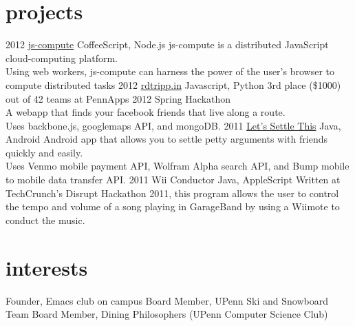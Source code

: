 \documentclass[print]{friggeri-cv}
\begin{document}
\section{projects}

\begin{entrylist}
  \entry
  {2012}
  {\href{http://andrewbraunstein.com:3000}{js-compute}}
  {CoffeeScript, Node.js}
  {js-compute is a distributed JavaScript cloud-computing platform. \\
    Using web workers, js-compute can harness the power of the user's
    browser to compute distributed tasks}
  \entry
  {2012}
  {\href{http://rdtripp.in}{rdtripp.in}}
  {Javascript, Python}
  {3rd place (\$1000) out of 42 teams at PennApps 2012 Spring
    Hackathon \\ 
    A webapp that finds your facebook friends that live along a
    route. \\
    Uses backbone.js, googlemaps API, and mongoDB.}
  \entry
  {2011}
  {\href{http://andrewbraunstein.com/settlethis.html}{Let's Settle This}}
  {Java, Android}
  {Android app that allows you to settle petty arguments with
    friends quickly and easily. \\ 
    Uses Venmo mobile payment API, Wolfram Alpha search API, and Bump mobile to mobile data transfer API.}
  \entry
  {2011}
  {Wii Conductor}
  {Java, AppleScript}
  {Written at TechCrunch’s Disrupt Hackathon 2011, this program allows
    the user to control the tempo and volume of a song playing in
    GarageBand by using a Wiimote to conduct the music.}
\end{entrylist}

\section{interests}

\begin{entrylist}
  \entry
  {Founder, Emacs club on campus}{}{}{}
  \entry
  {Board Member, UPenn Ski and Snowboard Team}{}{}{}
  \entry
  {Board Member, Dining Philosophers (UPenn Computer Science Club)}{}{}{}
  
\end{entrylist}
\end{document}
